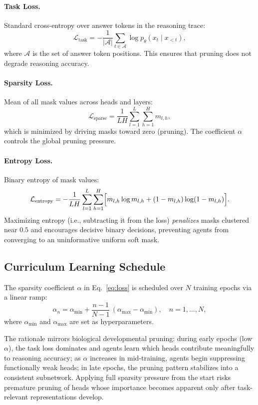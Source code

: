 \documentclass{article}
\newcommand{\Lcal}{\mathcal{L}}
\begin{document}
\paragraph{Task Loss.}
Standard cross-entropy over answer tokens in the reasoning trace:
\[
  \Lcal_{\text{task}} = -\frac{1}{|\mathcal{A}|}\sum_{t \in \mathcal{A}}
    \log p_\theta(x_t \mid x_{<t}),
\]
where $\mathcal{A}$ is the set of answer token positions. This ensures that pruning does not
degrade reasoning accuracy.

\paragraph{Sparsity Loss.}
Mean of all mask values across heads and layers:
\[
  \Lcal_{\text{sparse}} = \frac{1}{LH}\sum_{l=1}^{L}\sum_{h=1}^{H} m_{l,h},
\]
which is minimized by driving masks toward zero (pruning). The coefficient $\alpha$ controls
the global pruning pressure.

\paragraph{Entropy Loss.}
Binary entropy of mask values:
\[
  \Lcal_{\text{entropy}} = -\frac{1}{LH}\sum_{l=1}^{L}\sum_{h=1}^{H}
    \Bigl[ m_{l,h}\log m_{l,h} + (1-m_{l,h})\log(1-m_{l,h}) \Bigr].
\]
Maximizing entropy (i.e., subtracting it from the loss) \emph{penalizes} masks clustered near
$0.5$ and encourages decisive binary decisions, preventing agents from converging to an
uninformative uniform soft mask.

\subsection{Curriculum Learning Schedule}
\label{sec:method_curriculum}

The sparsity coefficient $\alpha$ in Eq.~\eqref{eq:loss} is scheduled over $N$ training
epochs via a linear ramp:
\begin{equation}
  \alpha_n = \alpha_{\min} + \frac{n-1}{N-1}\,(\alpha_{\max} - \alpha_{\min}),
  \quad n = 1, \ldots, N,
  \label{eq:curriculum}
\end{equation}
where $\alpha_{\min}$ and $\alpha_{\max}$ are set as hyperparameters.

The rationale mirrors biological developmental pruning: during early epochs (low $\alpha$),
the task loss dominates and agents learn which heads contribute meaningfully to reasoning
accuracy; as $\alpha$ increases in mid-training, agents begin suppressing functionally weak
heads; in late epochs, the pruning pattern stabilizes into a consistent subnetwork. Applying
full sparsity pressure from the start risks premature pruning of heads whose importance
becomes apparent only after task-relevant representations develop.
\end{document}
